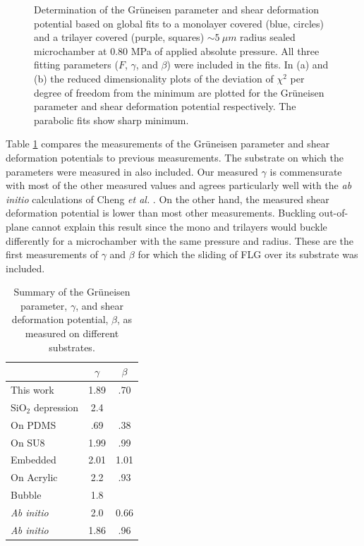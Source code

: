 \begin{figure}
	\begin{center}
	
	\end{center}
	\caption[Determination of the Gr\"{u}neisen parameter and shear deformation potential]{\label{fig:fri:gammabeta}Determination of the Gr\"{u}neisen parameter and shear deformation potential based on global fits to a monolayer covered (blue, circles) and a trilayer covered (purple, squares) $\sim 5 \ \mu m$ radius sealed microchamber at 0.80 MPa of applied absolute pressure.
	All three fitting parameters ($F$, $\gamma$, and $\beta$) were included in the fits.
	In (a) and (b) the reduced dimensionality plots of the deviation of $\chi^2$ per degree of freedom from the minimum are plotted for the Gr\"{u}neisen parameter and shear deformation potential respectively.
	The parabolic fits show sharp minimum.
	}
\end{figure}

Table \ref{tab:fri:gb} compares the measurements of the Gr\"{u}neisen parameter and shear deformation potentials to previous measurements.
The substrate on which the parameters were measured in also included.
Our measured $\gamma$ is commensurate with most of the other measured values and agrees particularly well with the \textit{ab initio} calculations of Cheng \textit{et al.} \cite{Cheng2011}.
On the other hand, the measured shear deformation potential is lower than most other measurements.
Buckling out-of-plane cannot explain this result since the mono and trilayers would buckle differently for a microchamber with the same pressure and radius.
These are the first measurements of $\gamma$ and $\beta$ for which the sliding of FLG over its substrate was included.

\begin{table}
	\begin{center}
	\begin{tabular}{l c  c }
		\hline
		\hline
		 & $\gamma$ & $\beta$ \\
		 \hline
		 This work & 1.89 & .70 \\
		 $\mathrm{SiO_2}$ depression \cite{Metzger2010} & 2.4 & \\
		 On PDMS \cite{Huang2009} & .69 & .38 \\
		 On SU8 \cite{Mohiuddin2009} & 1.99 & .99\\
		 Embedded \cite{Frank2010} & 2.01 & 1.01 \\
		 On Acrylic \cite{Yoon2011} & 2.2 & .93\\
		 Bubble \cite{Zabel2012} & 1.8 \\
		\textit{Ab initio} \cite{Thomsen2002} & 2.0 & 0.66 \\
		\textit{Ab initio} \cite{Cheng2011} & 1.86 & .96\\
		 \hline
		 \hline
	\end{tabular}
	\end{center}
	\caption[Summary of the Gr\"{u}neisen parameter, $\gamma$, and shear deformation potential, $\beta$, as measured on different substrates]{\label{tab:fri:gb} Summary of the Gr\"{u}neisen parameter, $\gamma$, and shear deformation potential, $\beta$, as measured on different substrates.}
\end{table}


